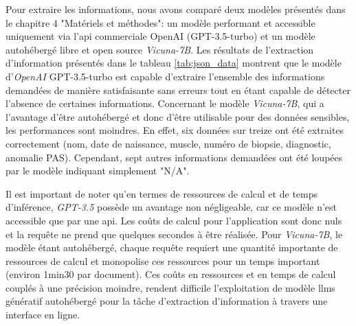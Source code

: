 Pour extraire les informations, nous avons comparé deux modèles présentés dans le chapitre 4 "Matériels et méthodes": un modèle performant et accessible uniquement via l'\gls{api} commerciale OpenAI (GPT-3.5-turbo) et un modèle autohébergé libre et open source \textit{Vicuna-7B}. Les résultats de l'extraction d'information présentés dans le tableau \ref{tab:json_data} montrent que le modèle d'\textit{OpenAI} GPT-3.5-turbo est capable d'extraire l'ensemble des informations demandées de manière satisfaisante sans erreurs tout en étant capable de détecter l'absence de certaines informations. Concernant le modèle \textit{Vicuna-7B}, qui a l'avantage d'être autohébergé et donc d'être utilisable pour des données sensibles, les performances sont moindres. En effet, six données sur treize ont été extraites correctement (nom, date de naissance, muscle, numéro de biopsie, diagnostic, anomalie PAS). Cependant, sept autres informations demandées ont été loupées par le modèle indiquant simplement "N/A".

Il est important de noter qu'en termes de ressources de calcul et de temps d'inférence, \textit{GPT-3.5} possède un avantage non négligeable, car ce modèle n'est accessible que par une \gls{api}. Les coûts de calcul pour l'application sont donc nuls et la requête ne prend que quelques secondes à être réalisée. Pour \textit{Vicuna-7B}, le modèle étant autohébergé, chaque requête requiert une quantité importante de ressources de calcul et monopolise ces ressources pour un temps important (environ 1min30 par document). Ces coûts en ressources et en temps de calcul couplés à une précision moindre, rendent difficile l'exploitation de modèle \gls{llms} génératif autohébergé pour la tâche d'extraction d'information à travers une interface en ligne. 

